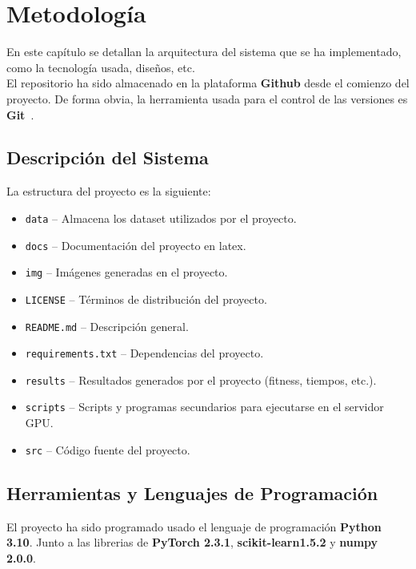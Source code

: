 \chapter{Metodología}\label{ch:Metodologia}
En este capítulo se detallan la arquitectura del sistema que se ha implementado, como la tecnología usada, diseños, etc.
\\[6pt]

El repositorio ha sido almacenado en la plataforma \textbf{Github} desde el comienzo del proyecto.
De forma obvia, la herramienta usada para el control de las versiones es \textbf{Git}~\cite{chacon2014pro}. \\[6pt]

\section{Descripción del Sistema}\label{sec:descripcion_del_sistema}
La estructura del proyecto es la siguiente:
\begin{itemize}
    \item \texttt{data} -- Almacena los dataset utilizados por el proyecto.
    \item \texttt{docs} -- Documentación del proyecto en latex.
    \item \texttt{img} -- Imágenes generadas en el proyecto.
    \item \texttt{LICENSE} -- Términos de distribución del proyecto.
    \item \texttt{README.md} -- Descripción general.
    \item \texttt{requirements.txt} -- Dependencias del proyecto.
    \item \texttt{results} -- Resultados generados por el proyecto (fitness, tiempos, etc.).
    \item \texttt{scripts} -- Scripts y programas secundarios para ejecutarse en el servidor GPU\@.
    \item \texttt{src} -- Código fuente del proyecto.
\end{itemize}

\section{Herramientas y Lenguajes de Programación}\label{sec:herramientas_y_lenguajes_de_programacion}
El proyecto ha sido programado usado el lenguaje de programación  \textbf{Python 3.10}.
Junto a las librerias de \textbf{PyTorch 2.3.1}, \textbf{scikit-learn1.5.2} y \textbf{numpy 2.0.0}. \\[6pt]

